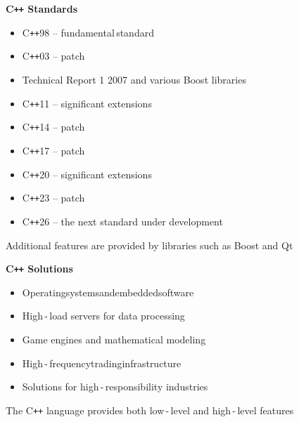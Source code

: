 \documentclass{beamer}
\begin{document}
\begin{frame}{\bf C\texttt{++} Standards}

    \begin{itemize}

        \item C\texttt{++}98 -- fundamental\,standard

        \item C\texttt{++}03 -- patch

        \item Technical Report 1 2007 and various Boost libraries

        \item C\texttt{++}11 -- significant extensions

        \item C\texttt{++}14 -- patch

        \item C\texttt{++}17 -- patch

        \item C\texttt{++}20 -- significant extensions

        \item C\texttt{++}23 -- patch

        \item C\texttt{++}26 -- the next standard under development
         
    \end{itemize}

    \begin{block}
    \justifying Additional features are provided by libraries such as Boost and Qt
    \end{block}
    
\end{frame}

\begin{frame}{\bf C\texttt{++} Solutions}
    
    \begin{itemize}

        \item Operating\;systems\;and\;embedded\;software

        \item High\,-\,load servers for data processing

        \item Game engines and mathematical modeling

        \item High\,-\,frequency\:trading\:infrastructure

        \item Solutions for high\,-\,responsibility industries
        
    \end{itemize}

    \begin{block}
    \justifying The C\texttt{++} language provides both low\,-\,level and high\,-\,level features
    \end{block}
    
\end{frame}
\end{document}
